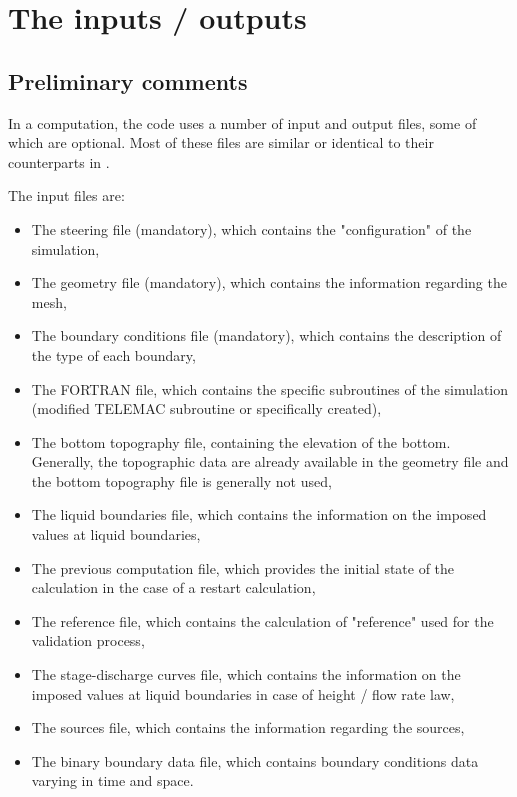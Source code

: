 \chapter{The inputs / outputs}

\section{Preliminary comments}

In a computation, the  code uses a number of input and output files,
some of which are optional. Most of these files are similar or identical to
their counterparts in .

The input files are:

\begin{itemize}
\item The steering file (mandatory), which contains the "configuration" of the
simulation,

\item The geometry file (mandatory), which contains the information regarding
the mesh,

\item The boundary conditions file (mandatory), which contains the description
of the type of each boundary,

\item The FORTRAN file, which contains the specific subroutines of the
simulation (modified TELEMAC subroutine or specifically created),

\item The bottom topography file, containing the elevation of the bottom.
Generally, the topographic data are already available in the
geometry file and the bottom topography file is generally not used,

\item The liquid boundaries file, which contains the information on the
imposed values at liquid boundaries,

\item The previous computation file, which provides the initial state of the
calculation in the case of a restart calculation,

\item The reference file, which contains the calculation of "reference" used
for the validation process,

\item The stage-discharge curves file, which contains the information on the
imposed values at liquid boundaries in case of height / flow rate law,

\item The sources file, which contains the information regarding the sources,

\item The binary boundary data file, which contains boundary conditions data
varying in time and space.
\end{itemize}

